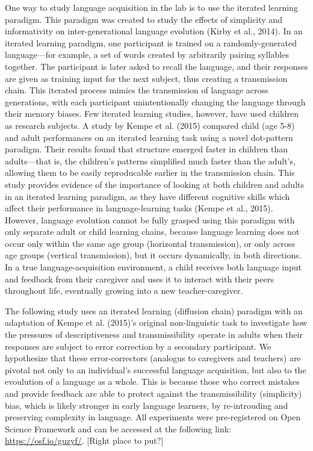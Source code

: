 \documentclass[10pt, letterpaper]{article}
\begin{document}
One way to study language acquisition in the lab is to use the iterated
learning paradigm. This paradigm was created to study the effects of
simplicity and informativity on inter-generational language evolution
(Kirby et al., 2014). In an iterated learning paradigm, one participant
is trained on a randomly-generated language---for example, a set of
words created by arbitrarily pairing syllables together. The participant
is later asked to recall the language, and their responses are given as
training input for the next subject, thus creating a transmission chain.
This iterated process mimics the transmission of language across
generations, with each participant unintentionally changing the language
through their memory biases. Few iterated learning studies, however,
have used children as research subjects. A study by Kempe et al. (2015)
compared child (age 5-8) and adult performances on an iterated learning
task using a novel dot-pattern paradigm. Their results found that
structure emerged faster in children than adults---that is, the
children's patterns simplified much faster than the adult's, allowing
them to be easily reproducable earlier in the transmission chain. This
study provides evidence of the importance of looking at both children
and adults in an iterated learning paradigm, as they have different
cognitive skills which affect their performance in language-learning
tasks (Kempe et al., 2015). However, language evolution cannot be fully
grasped using this paradigm with only separate adult or child learning
chains, because language learning does not occur only within the same
age group (horizontal transmission), or only across age groups (vertical
transmission), but it occurs dynamically, in both directions. In a true
language-acquisition environment, a child receives both language input
and feedback from their caregiver and uses it to interact with their
peers throughout life, eventually growing into a new teacher-caregiver.

The following study uses an iterated learning (diffusion chain) paradigm
with an adaptation of Kempe et al. (2015)'s original non-linguistic task
to investigate how the pressures of descriptiveness and transmissibility
operate in adults when their responses are subject to error correction
by a secondary participant. We hypothesize that these error-correctors
(analogus to caregivers and teachers) are pivotal not only to an
individual's successful language acquisition, but also to the evoulution
of a language as a whole. This is because those who correct mistakes and
provide feedback are able to protect against the transmissibility
(simplicity) bias, which is likely stronger in early language learners,
by re-introuding and preserving complexity in language. All experiments
were pre-registered on Open Science Framework and can be accessed at the
following link: \url{https://osf.io/guzyf/}. {[}Right place to put?{]}
\end{document}
